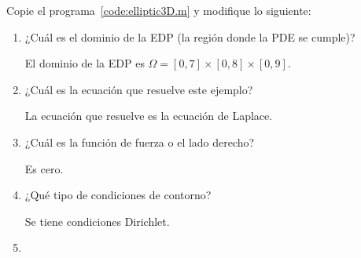 \begin{problem}
Copie el programa~\ref{code:elliptic3D.m} y modifique lo siguiente:

\begin{enumerate}
      \item

            ¿Cuál es el dominio de la EDP (la región donde la PDE se
            cumple)?

            \begin{solution}
                  El dominio de la EDP es
                  \begin{math}
                        \Omega=
                        \left[
                              0,7
                              \right]\times
                        \left[
                              0,8
                              \right]\times
                        \left[
                              0,9
                              \right]
                  \end{math}.
                  \noQED
            \end{solution}

      \item

            ¿Cuál es la ecuación que resuelve este ejemplo?

            \begin{solution}
                  La ecuación que resuelve es la ecuación de Laplace.
                  \noQED
            \end{solution}

      \item

            ¿Cuál es la función de fuerza o el lado derecho?

            \begin{solution}
                  Es cero.
                  \noQED
            \end{solution}

      \item

            ¿Qué tipo de condiciones de contorno?

            \begin{solution}
                  Se tiene condiciones Dirichlet.
                  \noQED
            \end{solution}

      \item


\end{enumerate}
\end{problem}
